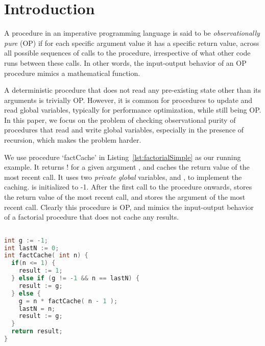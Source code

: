 \section{Introduction}

A procedure in an imperative programming language is said to be
\emph{observationally pure} (OP) if for each specific argument value it has
a specific return value, across all possible sequences of calls to the
procedure, irrespective of what other code runs between these calls.  In
other words, the input-output behavior of an OP procedure mimics a mathematical
function.


A deterministic procedure that does not read any
pre-existing state other than its arguments is trivially OP.
However, it is common for procedures to update and read global variables,
typically for performance optimization,
while still being OP.
In this paper, we focus on the problem of checking observational purity of
procedures that read and write global variables, especially in the presence of recursion,
which makes the problem harder.

We use procedure `factCache' in Listing~\ref{lst:factorialSimple}  as our running example. It
returns ! for a given argument , and caches the return value of the
most recent call. It uses two \emph{private global} variables,  and , to
implement the caching.  is initialized to -1. After
the first call to the procedure onwards,  stores the return value
of the most recent call, and  stores the argument of
the most recent call. Clearly this procedure is OP, and mimics the
input-output behavior of a factorial procedure that does not cache
any results. 

\begin{lstlisting}[float,language=c,basicstyle=\scriptsize,caption= {Procedure factCache:
      returns n!, and memoizes most recent result.},
    label=lst:factorialSimple]
  
int g := -1;
int lastN := 0;
int factCache( int n) {
  if(n <= 1) {
    result := 1;
  } else if (g != -1 && n == lastN) {
    result := g;
  } else {
    g = n * factCache( n - 1 );
    lastN = n;
    result := g;
  }
  return result;
}
\end{lstlisting}


